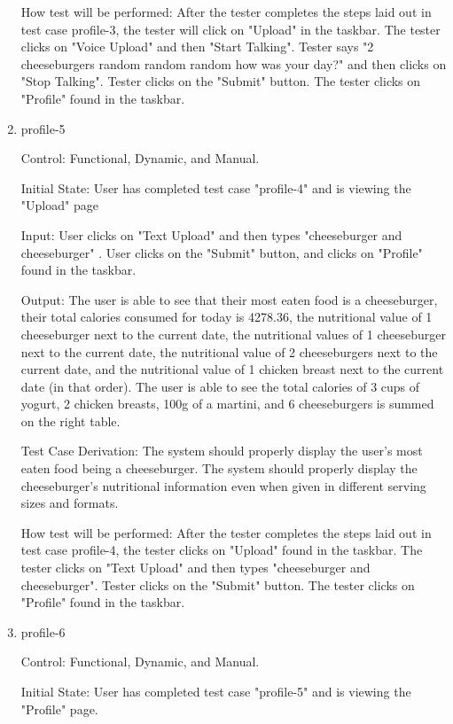 \documentclass[12pt, titlepage]{article}
\begin{document}
\begin{enumerate}
		How test will be performed: After the tester completes the steps laid out in test case profile-3, the tester will click on "Upload" in the taskbar. The tester clicks on "Voice Upload" and then "Start Talking". Tester says "2 cheeseburgers random random random how was your day?" and then clicks on "Stop Talking". Tester clicks on the "Submit" button. The tester clicks on "Profile" found in the taskbar.
		
		\item{profile-5\\}
		
		Control: Functional, Dynamic, and Manual.
		
		Initial State: User has completed test case "profile-4" and is viewing the "Upload" page
		
		Input: User clicks on "Text Upload" and then types "cheeseburger and cheeseburger" . User clicks on the "Submit" button, and clicks on "Profile" found in the taskbar.
		
		Output: The user is able to see that their most eaten food is a cheeseburger, their total calories consumed for today is 4278.36, the nutritional value of 1 cheeseburger next to the current date, the nutritional values of 1 cheeseburger next to the current date, the nutritional value of 2 cheeseburgers next to the current date, and the nutritional value of 1 chicken breast next to the current date (in that order). The user is able to see the total calories of 3 cups of yogurt, 2 chicken breasts, 100g of a martini, and 6 cheeseburgers is summed on the right table.
		
		Test Case Derivation: The system should properly display the user's most eaten food being a cheeseburger. The system should properly display the cheeseburger's nutritional information even when given in different serving sizes and formats.
		
		How test will be performed: After the tester completes the steps laid out in test case profile-4, the tester clicks on "Upload" found in the taskbar. The tester clicks on "Text Upload" and then types "cheeseburger and cheeseburger". Tester clicks on the "Submit" button. The tester clicks on "Profile" found in the taskbar.
		
		\item{profile-6\\}
		
		Control: Functional, Dynamic, and Manual.
		
		Initial State: User has completed test case "profile-5" and is viewing the "Profile" page.
		

\end{enumerate}
\end{document}
